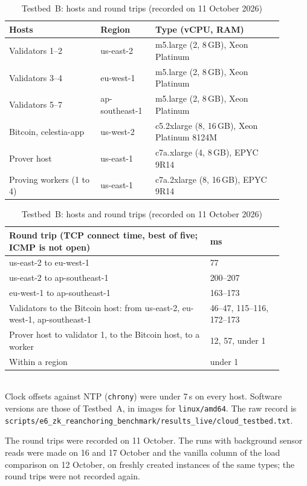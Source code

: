 \begin{table}[H]
\caption{Testbed~B: hosts and round trips (recorded on 11 October 2026)}
\label{tab:testbedB}
\centering
\footnotesize
\begin{tabular}{@{}p{0.30\linewidth}p{0.18\linewidth}p{0.42\linewidth}@{}}
\toprule
\textbf{Hosts} & \textbf{Region} & \textbf{Type (vCPU, RAM)} \\
\midrule
Validators 1--2 & us-east-2 & m5.large (2, 8\,GB), Xeon Platinum \\
Validators 3--4 & eu-west-1 & m5.large (2, 8\,GB), Xeon Platinum \\
Validators 5--7 & ap-southeast-1 & m5.large (2, 8\,GB), Xeon Platinum \\
Bitcoin, celestia-app & us-west-2 & c5.2xlarge (8, 16\,GB), Xeon Platinum 8124M \\
Prover host & us-east-1 & c7a.xlarge (4, 8\,GB), EPYC 9R14 \\
Proving workers (1 to 4) & us-east-1 & c7a.2xlarge (8, 16\,GB), EPYC 9R14 \\
\bottomrule
\end{tabular}

\vspace{4pt}
\begin{tabular}{@{}p{0.66\linewidth}p{0.24\linewidth}@{}}
\toprule
\textbf{Round trip (TCP connect time, best of five; ICMP is not open)} & \textbf{ms} \\
\midrule
us-east-2 to eu-west-1 & 77 \\
us-east-2 to ap-southeast-1 & 200--207 \\
eu-west-1 to ap-southeast-1 & 163--173 \\
Validators to the Bitcoin host: from us-east-2, eu-west-1, ap-southeast-1 & 46--47, 115--116, 172--173 \\
Prover host to validator 1, to the Bitcoin host, to a worker & 12, 57, under 1 \\
Within a region & under 1 \\
\bottomrule
\end{tabular}
\\[2pt]
\footnotesize Clock offsets against NTP (\texttt{chrony}) were under 7\,\textmu s on every host. Software versions are those of
Testbed~A, in images for \texttt{linux/amd64}. The raw record is
\texttt{scripts/e6\_zk\_reanchoring\_benchmark/results\_live/cloud\_testbed.txt}.
\end{table}

The round trips were recorded on 11 October. The runs with background sensor reads were made on 16 and 17 October and the vanilla column of the load comparison on 12 October, on freshly created instances of the same types; the round trips were not recorded again.


